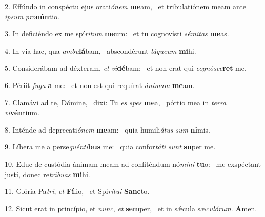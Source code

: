2. Effúndo in conspéctu ejus orati\textit{ó}\textit{nem} \textbf{me}am, \ast\  et tribulatiónem meam ante \textit{ip}\textit{sum} \textit{pro}\textbf{nún}tio.\

3. In deficiéndo ex me spí\textit{ri}\textit{tum} \textbf{me}um: \ast\  et tu cognovísti \textit{sé}\textit{mi}\textit{tas} \textbf{me}as.\

4. In via hac, qua \textit{am}\textit{bu}\textbf{lá}bam, \ast\  abscondérunt \textit{lá}\textit{que}\textit{um} \textbf{mi}hi.\

5. Considerábam ad déxteram, \textit{et} \textit{vi}\textbf{dé}bam: \ast\  et non erat qui \textit{co}\textit{gnó}\textit{sce}\textbf{ret} me.\

6. Périit \textit{fu}\textit{ga} \textbf{a} me: \ast\  et non est qui requírat \textit{á}\textit{ni}\textit{mam} \textbf{me}am.\

7. Clamávi ad te, Dómine, \dag\  dixi: Tu \textit{es} \textit{spes} \textbf{me}a, \ast\  pórtio mea in \textit{ter}\textit{ra} \textit{vi}\textbf{vén}tium.\

8. Inténde ad deprecati\textit{ó}\textit{nem} \textbf{me}am: \ast\  quia humili\textit{á}\textit{tus} \textit{sum} \textbf{ni}mis.\

9. Líbera me a perse\textit{quén}\textit{ti}\textbf{bus} me: \ast\  quia confor\textit{tá}\textit{ti} \textit{sunt} \textbf{su}per me.\

10. Educ de custódia ánimam meam ad confiténdum nó\textit{mi}\textit{ni} \textbf{tu}o: \ast\  me exspéctant justi, donec re\textit{trí}\textit{bu}\textit{as} \textbf{mi}hi.\

11. Glória Pa\textit{tri}, \textit{et} \textbf{Fí}lio, \ast\  et Spi\textit{rí}\textit{tu}\textit{i} \textbf{Sanc}to.\

12. Sicut erat in princípio, et \textit{nunc}, \textit{et} \textbf{sem}per, \ast\  et in sǽcula sæ\textit{cu}\textit{ló}\textit{rum}. \textbf{A}men.\

